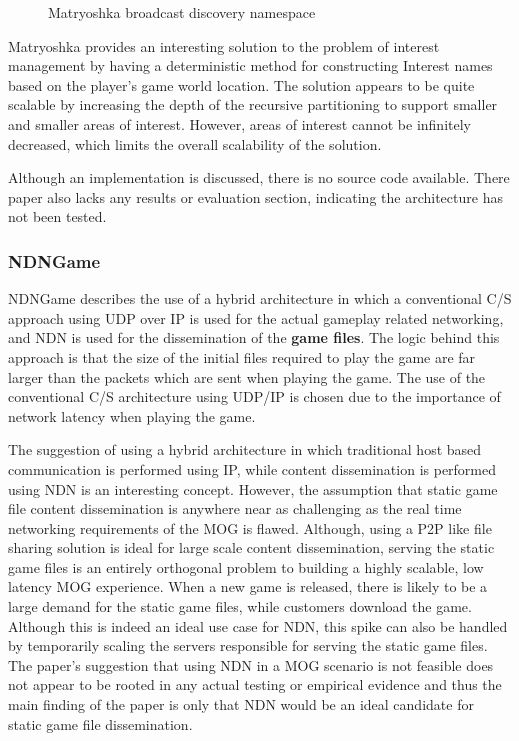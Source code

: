 \begin{figure}[H]
    \centering
    \caption{Matryoshka broadcast discovery namespace \cite{ndn-multiplayer-game}}
    \label{fig:matryoshka-discovery}
\end{figure}

Matryoshka provides an interesting solution to the problem of interest management by having a deterministic method for constructing Interest names based on the player's game world location. The solution appears to be quite scalable by increasing the depth of the recursive partitioning to support smaller and smaller areas of interest. However, areas of interest cannot be infinitely decreased, which limits the overall scalability of the solution. 

Although an implementation is discussed, there is no source code available. There paper also lacks any results or evaluation section, indicating the architecture has not been tested.   

\subsubsection*{NDNGame \cite{ndn-game}}
NDNGame describes the use of a hybrid architecture in which a conventional C/S approach using UDP over IP is used for the actual gameplay related networking, and NDN is used for the dissemination of the \textbf{game files}. The logic behind this approach is that the size of the initial files required to play the game are far larger than the packets which are sent when playing the game. The use of the conventional C/S architecture using UDP/IP is chosen due to the importance of network latency when playing the game. 

The suggestion of using a hybrid architecture in which traditional host based communication is performed using IP, while content dissemination is performed using NDN is an interesting concept. However, the assumption that static game file content dissemination is anywhere near as challenging as the real time networking requirements of the MOG is flawed. Although, using a P2P like file sharing solution is ideal for large scale content dissemination, serving the static game files is an entirely orthogonal problem to building a highly scalable, low latency MOG experience. When a new game is released, there is likely to be a large demand for the static game files, while customers download the game. Although this is indeed an ideal use case for NDN, this spike can also be handled by temporarily scaling the servers responsible for serving the static game files. The paper's suggestion that using NDN in a MOG scenario is not feasible does not appear to be rooted in any actual testing or empirical evidence and thus the main finding of the paper is only that NDN would be an ideal candidate for static game file dissemination.  

